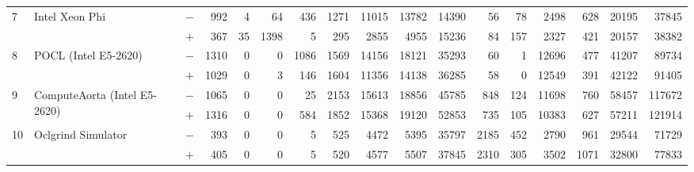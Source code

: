 \begin{tabular}{lll | rrrrrrr | rrrrrrr }
\hline
\multirow{ 2}{*}{7} & \multirow{ 2}{*}{Intel Xeon Phi} & $-$ & 992 & 4 & 64 & 436 & 1271 & 11015 & 13782       & 14390 & 56 & 78 & 2498 & 628 & 20195 & 37845 \\& & $+$ & 367 & 35 & 1398 & 5 & 295 & 2855 & 4955 & 15236 & 84 & 157 & 2327 & 421 & 20157 & 38382 \\
\hline
\multirow{ 2}{*}{8} & \multirow{ 2}{*}{POCL (Intel E5-2620)} & $-$ & 1310 & 0 & 0 & 1086 & 1569 & 14156 & 18121       & 35293 & 60 & 1 & 12696 & 477 & 41207 & 89734 \\& & $+$ & 1029 & 0 & 3 & 146 & 1604 & 11356 & 14138 & 36285 & 58 & 0 & 12549 & 391 & 42122 & 91405 \\
\hline
\multirow{ 2}{*}{9} & \multirow{ 2}{*}{ComputeAorta (Intel E5-2620)} & $-$ & 1065 & 0 & 0 & 25 & 2153 & 15613 & 18856       & 45785 & 848 & 124 & 11698 & 760 & 58457 & 117672 \\& & $+$ & 1316 & 0 & 0 & 584 & 1852 & 15368 & 19120 & 52853 & 735 & 105 & 10383 & 627 & 57211 & 121914 \\
\hline
\multirow{ 2}{*}{10} & \multirow{ 2}{*}{Oclgrind Simulator} & $-$ & 393 & 0 & 0 & 5 & 525 & 4472 & 5395       & 35797 & 2185 & 452 & 2790 & 961 & 29544 & 71729 \\& & $+$ & 405 & 0 & 0 & 5 & 520 & 4577 & 5507 & 37845 & 2310 & 305 & 3502 & 1071 & 32800 & 77833 \\
  \bottomrule
\end{tabular}

